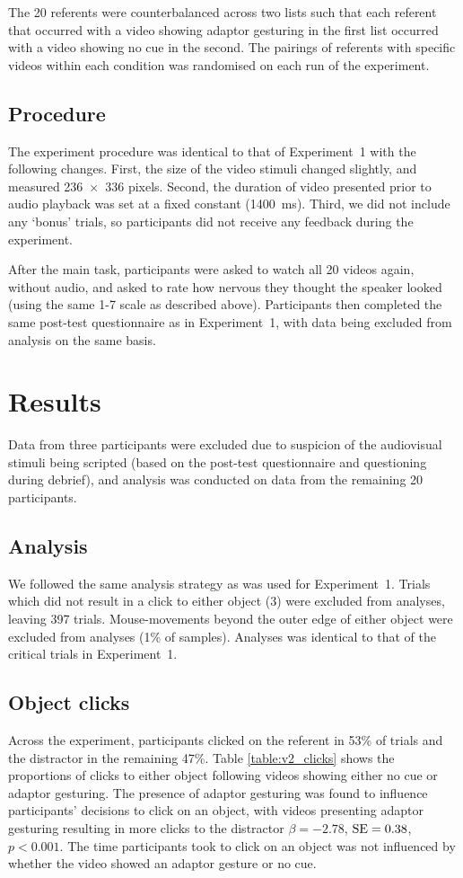 \documentclass[a4paper,man,natbib]{apa6}
\newcommand{\resultsLog}[3]{$\beta = #1$, $\textnormal{SE} = #2$, $p #3$}
\begin{document}
The 20 referents were counterbalanced across two lists such that each referent that occurred with a video showing adaptor gesturing in the first list occurred with a video showing no cue in the second.
The pairings of referents with specific videos within each condition was randomised on each run of the experiment.

\subsection{Procedure}
The experiment procedure was identical to that of Experiment~1 with the following changes.
First, the size of the video stimuli changed slightly, and measured 236~$\times$~336 pixels.
Second, the duration of video presented prior to audio playback was set at a fixed constant (1400~ms).
Third, we did not include any `bonus' trials, so participants did not receive any feedback during the experiment.

After the main task, participants were asked to watch all 20 videos again, without audio, and asked to rate how nervous they thought the speaker looked (using the same 1-7 scale as described above).
Participants then completed the same post-test questionnaire as in Experiment~1, with data being excluded from analysis on the same basis.

\section{Results}
Data from three participants were excluded due to suspicion of the audiovisual stimuli being scripted (based on the post-test questionnaire and questioning during debrief), and analysis was conducted on data from the remaining 20 participants.

\subsection{Analysis}
We followed the same analysis strategy as was used for Experiment~1.
Trials which did not result in a click to either object (3) were excluded from analyses, leaving 397 trials.
Mouse-movements beyond the outer edge of either object were excluded from analyses (1\% of samples).
Analyses was identical to that of the critical trials in Experiment~1.

\subsection{Object clicks}
Across the experiment, participants clicked on the referent in 53\% of trials and the distractor in the remaining 47\%.
Table \ref{table:v2_clicks} shows the proportions of clicks to either object following videos showing either no cue or adaptor gesturing.
The presence of adaptor gesturing was found to influence participants' decisions to click on an object, with videos presenting adaptor gesturing resulting in more clicks to the distractor \resultsLog{-2.78}{0.38}{<0.001}.
The time participants took to click on an object was not influenced by whether the video showed an adaptor gesture or no cue.
\end{document}
